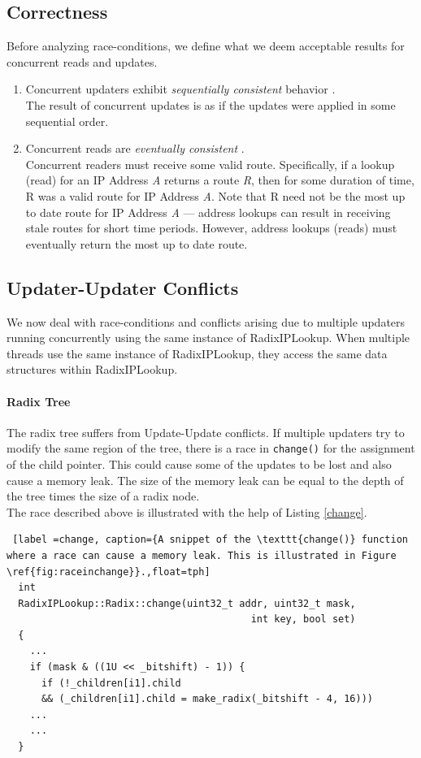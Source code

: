 \documentclass[a4paper]{article}
\begin{document}
\subsection{Correctness}
\label{sec:correctness}
Before analyzing race-conditions, we define what we deem acceptable results for concurrent reads and updates.
\begin{enumerate}
\item Concurrent updaters exhibit \emph{sequentially consistent} behavior \cite{seqconsistency}.\\ The result of concurrent updates is as if the updates were applied in some sequential order.
\item Concurrent reads are \emph{eventually consistent} \cite{eventualconsistency}.\\ Concurrent readers must receive some valid route. Specifically, if a lookup (read) for an IP Address \emph{A} returns a route \emph{R}, then for some duration of time, R was a valid route for IP Address \emph{A}. Note that R need not be the most up to date route for IP Address \emph{A} --- address lookups can result in receiving stale routes for short time periods. However, address lookups (reads) must eventually return the most up to date route.

\end{enumerate} 
\subsection{Updater-Updater Conflicts}
We now deal with race-conditions and conflicts arising due to multiple updaters running concurrently using the same instance of RadixIPLookup. When multiple threads use the same instance of RadixIPLookup, they access the same data structures within RadixIPLookup.
\paragraph{Radix Tree}
The radix tree suffers from Update-Update conflicts. If multiple updaters try to modify the same region of the tree, there is a race in \verb+change()+ for the assignment of the child pointer. This could cause some of the updates to be lost and also cause a memory leak. The size of the memory leak can be equal to the depth of the tree times the size of a radix node.\\

The race described above is illustrated with the help of Listing \ref{change}.
\begin{lstlisting} [label =change, caption={A snippet of the \texttt{change()} function where a race can cause a memory leak. This is illustrated in Figure \ref{fig:raceinchange}}.,float=tph]
  int
  RadixIPLookup::Radix::change(uint32_t addr, uint32_t mask,
                                          int key, bool set)
  {
    ...
    if (mask & ((1U << _bitshift) - 1)) {
      if (!_children[i1].child
      && (_children[i1].child = make_radix(_bitshift - 4, 16)))
    ...
    ...
  }
\end{lstlisting}
\end{document}

